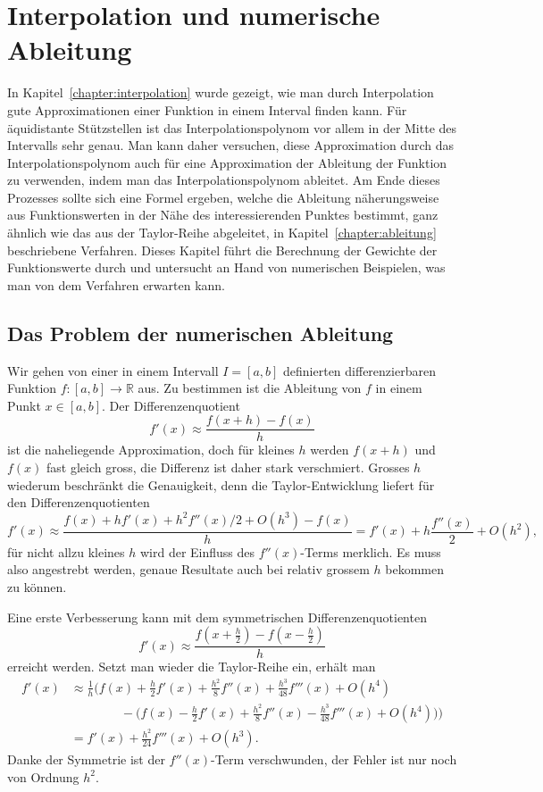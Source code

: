 %
%
%
\chapter{Interpolation und numerische Ableitung\label{chapter:interdiff}}
\rhead{}
\begin{refsection}

{\parindent0pt
In} Kapitel~\ref{chapter:interpolation} wurde gezeigt, wie man durch
Interpolation gute Approximationen einer Funktion in einem Interval
finden kann.
Für äquidistante Stützstellen ist das Interpolationspolynom vor allem in
der Mitte des Intervalls sehr genau.
Man kann daher versuchen, diese Approximation durch das Interpolationspolynom
auch für eine Approximation der Ableitung der Funktion zu verwenden, indem
man das Interpolationspolynom ableitet.
Am Ende dieses Prozesses sollte sich eine Formel ergeben, welche die
Ableitung näherungsweise aus Funktionswerten in der Nähe des
interessierenden Punktes bestimmt, ganz ähnlich wie das aus der
Taylor-Reihe abgeleitet, in Kapitel~\ref{chapter:ableitung} beschriebene
Verfahren.
Dieses Kapitel führt die Berechnung der Gewichte der Funktionswerte durch
und untersucht an Hand von numerischen Beispielen, was man von dem Verfahren
erwarten kann.

\section{Das Problem der numerischen Ableitung}
Wir gehen von einer in einem Intervall $I=[a,b]$ definierten differenzierbaren
Funktion $f\colon[a,b]\to\mathbb R$ aus. 
Zu bestimmen ist die Ableitung von $f$ in einem Punkt $x\in[a,b]$.
Der Differenzenquotient
\[
f'(x)
\approx
\frac{f(x+h)-f(x)}{h}
\]
ist die naheliegende Approximation, doch für kleines $h$ werden $f(x+h)$ und
$f(x)$ fast gleich gross, die Differenz ist daher stark verschmiert.
Grosses $h$ wiederum beschränkt die Genauigkeit, denn die Taylor-Entwicklung
liefert für den Differenzenquotienten
\[
f'(x)
\approx
\frac{f(x) + hf'(x) + h^2f''(x)/2 + O(h^3) - f(x)}{h}
=
f'(x) + h\frac{f''(x)}2 + O(h^2),
\]
für nicht allzu kleines $h$ wird der Einfluss des $f''(x)$-Terms
merklich.
Es muss also angestrebt werden, genaue Resultate auch bei relativ grossem
$h$ bekommen zu können.

Eine erste Verbesserung kann mit dem symmetrischen Differenzenquotienten
\[
f'(x)
\approx
\frac{f(x+\frac{h}2) -f(x-\frac{h}2)}{h}
\]
erreicht werden.
Setzt man wieder die Taylor-Reihe ein, erhält man
\begin{align*}
f'(x) &\approx
\frac{1}{h} \biggl(
f(x) + \frac{h}2 f'(x) + \frac{h^2}{8} f''(x) + \frac{h^3}{48}f'''(x) + O(h^4)
\\
&\qquad\qquad
-
\biggl(
f(x) - \frac{h}2 f'(x) + \frac{h^2}{8} f''(x) - \frac{h^3}{48}f'''(x) + O(h^4)
\biggr)
\biggr)
\\
&=
f'(x) + \frac{h^2}{24}f'''(x) + O(h^3).
\end{align*}
Danke der Symmetrie ist der $f''(x)$-Term verschwunden, der Fehler ist nur
noch von Ordnung $h^2$.


\end{refsection}
